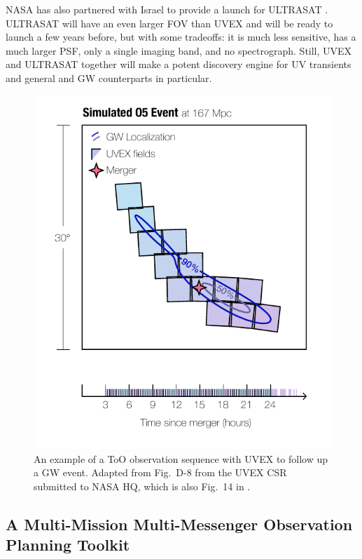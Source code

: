 \documentclass[twocolumn,times]{aastex631}
\begin{document}
NASA has also partnered with Israel to provide a launch for ULTRASAT \citep{2024ApJ...964...74S}. ULTRASAT will have an even larger \ac{FOV} than \ac{UVEX} and will be ready to launch a few years before, but with some tradeoffs: it is much less sensitive, has a much larger \ac{PSF}, only a single imaging band, and no spectrograph. Still, \ac{UVEX} and ULTRASAT together will make a potent discovery engine for \ac{UV} transients and general and \ac{GW} counterparts in particular.

\begin{figure}
    \includegraphics[width=\columnwidth]{figures/uvex-tiling}
    \caption{\label{fig:uvex-tiling}An example of a \ac{ToO} observation sequence with \ac{UVEX} to follow up a \ac{GW} event. Adapted from Fig.~D-8 from the \ac{UVEX} \ac{CSR} submitted to NASA \ac{HQ}, which is also Fig.~14 in \citet{2021arXiv211115608K}.}
\end{figure}

\subsection{A Multi-Mission Multi-Messenger Observation Planning Toolkit}
\end{document}
